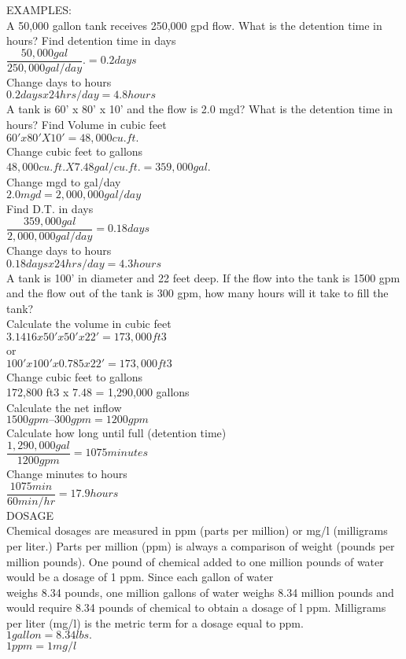 \documentclass{article}
\begin{document}
EXAMPLES:\\
A 50,000 gallon tank receives 250,000 gpd flow. What is the detention time in hours?  Find detention time in days\\
$\dfrac{50,000 gal}{250,000 gal/day}. = 0.2 days$\\
Change days to hours\\
$0.2 days x 24 hrs/day = 4.8 hours$\\
A tank is 60' x 80' x 10' and the flow is 2.0 mgd? What is the detention time in hours? Find Volume in cubic feet\\
$60' x 80' X 10' = 48,000 cu.ft.$\\
Change cubic feet to gallons\\
$48,000 cu.ft. X 7.48 gal/cu.ft.= 359,000 gal$.\\
Change mgd to gal/day\\
$2.0 mgd = 2,000,000 gal/day$\\
Find D.T. in days\\
$\dfrac{359,000 gal}{2,000,000 gal/day} = 0.18 days$\\
Change days to hours\\
$0.18 days x 24 hrs/day = 4.3 hours$\\
A tank is 100' in diameter and 22 feet deep. If the flow into the tank is 1500 gpm and the flow out of the tank is 300 gpm, how many hours will it take to fill the tank?\\
Calculate the volume in cubic feet\\
$3.1416 x 50' x 50' x 22' = 173,000 ft3$\\
or\\
$100' x 100' x 0.785 x 22' = 173,000 ft3$\\
Change cubic feet to gallons\\
172,800 ft3 x 7.48 = 1,290,000 gallons\\
Calculate the net inflow\\
$1500 gpm – 300 gpm = 1200 gpm$\\
Calculate how long until full (detention time)\\
$\dfrac{1,290,000 gal}{1200 gpm} = 1075 minutes$\\
Change minutes to hours\\
$\dfrac{1075 min}{60 min/hr} = 17.9 hours$\\
DOSAGE\\
Chemical dosages are measured in ppm (parts per million) or mg/l (milligrams per liter.) Parts per million (ppm) is always a comparison of weight (pounds per million pounds). One pound of chemical added to one million pounds of water would be a dosage of 1 ppm. Since each gallon of water\\
weighs 8.34 pounds, one million gallons of water weighs 8.34 million pounds and would require 8.34 pounds of chemical to obtain a dosage of l ppm. Milligrams per liter (mg/l) is the metric term for a dosage equal to ppm. \\
$1 gallon = 8.34 lbs.$\\
$1 ppm = 1 mg/l$\\
\end{document}
